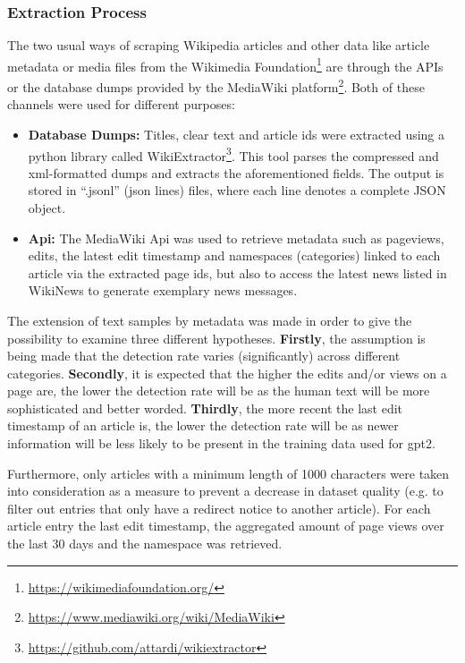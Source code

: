 \subsubsection{Extraction Process}
\label{sub:extraction_process}

The two usual ways of scraping Wikipedia articles and other data like article metadata or media files from the Wikimedia Foundation\footnote{\url{https://wikimediafoundation.org/}} are through the APIs or the database dumps provided by the MediaWiki platform\footnote{\url{https://www.mediawiki.org/wiki/MediaWiki}}.
Both of these channels were used for different purposes:\\
\begin{itemize}
    \item{\textbf{Database Dumps:}} Titles, clear text and article ids were extracted using a python library called WikiExtractor\footnote{\url{https://github.com/attardi/wikiextractor}}. This tool parses the compressed and xml-formatted dumps and extracts the aforementioned fields. The output is stored in “.jsonl” (json lines) files, where each line denotes a complete JSON object.
    \item{\textbf{Api:}} The MediaWiki Api was used to retrieve metadata such as pageviews, edits, the latest edit timestamp and namespaces (categories) linked to each article via the extracted page ids, but also to access the latest news listed in WikiNews to generate exemplary news messages.
\end{itemize}

The extension of text samples by metadata was made in order to give the possibility to examine three different hypotheses. \textbf{Firstly}, the assumption is being made that the detection rate varies (significantly) across different categories. \textbf{Secondly}, it is expected that the higher the edits and/or views on a page are, the lower the detection rate will be as the human text will be more sophisticated and better worded. \textbf{Thirdly}, the more recent the last edit timestamp of an article is, the lower the detection rate will be as newer information will be less likely to be present in the training data used for \gls{gpt2}.

Furthermore, only articles with a minimum length of 1000 characters were taken into consideration as a measure to prevent a decrease in dataset quality (e.g. to filter out entries that only have a redirect notice to another article). For each article entry the last edit timestamp, the aggregated amount of page views over the last 30 days and the namespace was retrieved.
